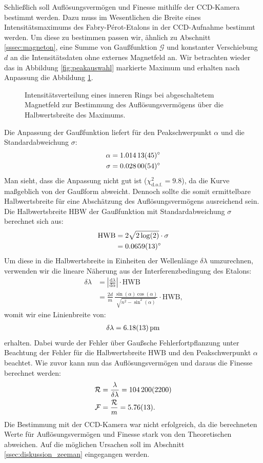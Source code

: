 \documentclass[11pt, a4paper]{article}
\begin{document}
Schließlich soll Auflösungsvermögen und Finesse mithilfe der CCD-Kamera bestimmt werden.
Dazu muss im Wesentlichen die Breite eines Intensitätsmaximums des Fabry-Pérot-Etalons in der CCD-Aufnahme bestimmt werden.
Um diese zu bestimmen passen wir, ähnlich zu Abschnitt \ref{sssec:magneton}, eine Summe von Gaußfunktion $\mathcal{G}$ und konstanter Verschiebung $d$ an die Intensitätsdaten ohne externes Magnetfeld an.
Wir betrachten wieder das in Abbildung \ref{fig:peakauswahl} markierte Maximum und erhalten nach Anpassung die Abbildung \ref{fig:gauss0}.
\begin{figure}[h]
	\centering
	
	\caption{Intensitätsverteilung eines inneren Rings bei abgeschaltetem Magnetfeld zur Bestimmung des Auflösungsvermögens über die Halbwertsbreite des Maximums.}
	\label{fig:gauss0}
\end{figure}
Die Anpassung der Gaußfunktion liefert für den Peakschwerpunkt $\alpha$ und die Standardabweichung $\sigma$:
\begin{align*}
	\alpha &= \SI{1.01413 +- 0.00045}{\degree}\\
	\sigma &= \SI{0.02800 +- 0.00054}{\degree}
\end{align*}
Man sieht, dass die Anpassung nicht gut ist ($\chi^2_\mathrm{d.o.f.} = 9.8$), da die Kurve maßgeblich von der Gaußform abweicht.
Dennoch sollte die somit ermittelbare Halbwertsbreite für eine Abschätzung des Auflösungsvermögens ausreichend sein.
Die Halbwertsbreite $\mathrm{HBW}$ der Gaußfunktion mit Standardabweichung $\sigma$ berechnet sich aus:
\begin{align*}
\mathrm{HWB} &= 2 \sqrt{2\log(2)} \cdot \sigma\\
 &= \SI{0.0659 +- 0.0013}{\degree}
\end{align*}
Um diese in die Halbwertsbreite in Einheiten der Wellenlänge $\delta \lambda$ umzurechnen, verwenden wir die lineare Näherung aus der Interferenzbedingung des Etalons:
\begin{align*}
	\delta \lambda &= \left| \frac{\mathrm{d}\lambda}{\mathrm{d}\alpha} \right| \cdot \mathrm{HWB} \\
	 &= \frac{2d}{m} \, \frac{\sin(\alpha) \cos(\alpha)}{\sqrt{n^2-\sin^2(\alpha)}} \cdot \mathrm{HWB}\text{,}
\end{align*}
womit wir eine Linienbreite von:
\begin{align*}
	\delta \lambda = \SI{6.18 +- 0.13}{\pico\metre}
\end{align*}
erhalten.
Dabei wurde der Fehler über Gaußsche Fehlerfortpflanzung unter Beachtung der Fehler für die Halbwertsbreite $\mathrm{HWB}$ und den Peakschwerpunkt $\alpha$ beachtet.
Wie zuvor kann nun das Auflösungsvermögen und daraus die Finesse berechnet werden:
\begin{align}
	\mathcal{R} &= \frac{\lambda}{\delta \lambda} = \num{104200 +- 2200} \\
	\mathcal{F} &= \frac{\mathcal{R}}{m} = \num{5.76 +- 0.13}\text{.}
\end{align}
Die Bestimmung mit der CCD-Kamera war nicht erfolgreich, da die berechneten Werte für Auflösungsvermögen und Finesse stark von den Theoretischen abweichen.
Auf die möglichen Ursachen soll im Abschnitt \ref{ssec:diskussion_zeeman} eingegangen werden.
\end{document}

